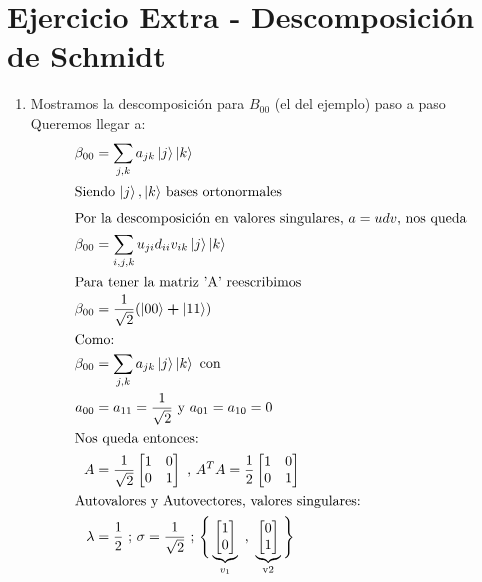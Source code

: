 \documentclass[a4paper]{article}
\begin{document}
\section {Ejercicio Extra - Descomposición de Schmidt}
  \begin{enumerate}[label=(\alph*)]
    \item{Mostramos la descomposición para $B_{00}$ (el del ejemplo) paso a paso}\\
    
    Queremos llegar a:\\
    \begin{align*}
        \beta_{00} &= \sum_{j,k} a_{jk} \ket{j}\ket{k}\\
        \intertext{Siendo $\ket{j}, \ket{k}$ bases ortonormales}
        \intertext{Por la descomposición en valores singulares, $a = udv$, nos queda}
        \beta_{00} &= \sum_{i,j,k} u_{ji} d_{ii} v_{ik} \ket{j}\ket{k}\\
        \intertext{Para tener la matriz 'A' reescribimos}
        \beta_{00} &= \frac{1}{\sqrt{2}}(\ket{00} \bm{+} \ket{11})\\
        \intertext{Como:}
        \beta_{00} &= \sum_{j,k} a_{jk} \ket{j}\ket{k} \text{ con } \\
        a_{00}&=a_{11}=\frac{1}{\sqrt{2}} \text{ y } a_{01}=a_{10}=0\\
        \intertext{Nos queda entonces:}
        A &= \frac{1}{\sqrt{2}}
            \begin{bmatrix}
                1 & 0 \\
                0 & 1 \\
            \end{bmatrix}
            \text{      ,       }
        A^TA = \frac{1}{2}
            \begin{bmatrix}
                1 & 0 \\
                0 & 1 \\
            \end{bmatrix}\\
            \intertext{Autovalores y Autovectores, valores singulares: } \lambda &= \frac{1}{2} \text{ ; } \sigma = \frac{1}{\sqrt{2}} \text{ ; } 
             \Bigg\{ \underbrace{\begin{bmatrix} 1 \\ 0 \end{bmatrix}}_{v_1} \text{ , } \underbrace{\begin{bmatrix} 0 \\ 1 \end{bmatrix}}_{\text{v2}}\Bigg\} \\

\end{align*}
\end{enumerate}
\end{document}
